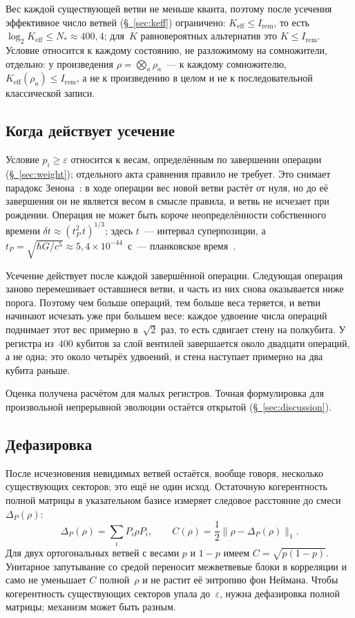 \documentclass[11pt,a4paper]{article}
\newcommand{\Ost}{I_{\mathrm{rem}}}
\newcommand{\Keff}{K_{\mathrm{eff}}}
\begin{document}
Вес каждой существующей ветви не меньше кванта, поэтому после усечения эффективное число ветвей (\hyperref[sec:keff]{\S~\ref*{sec:keff}}) ограничено: $\Keff\le\Ost$, то есть $\log_2\Keff\le N_*\approx400{,}4$; для~$K$ равновероятных альтернатив это $K\le\Ost$. Условие относится к каждому состоянию, не разложимому на сомножители, отдельно: у произведения $\rho=\bigotimes_a\rho_a$~--- к каждому сомножителю, $\Keff(\rho_a)\le\Ost$, а не к произведению в целом и не к последовательной классической записи.

\subsection{Когда действует усечение}
\label{sec:when}

Условие $p_i\ge\varepsilon$ относится к весам, определённым по завершении операции (\hyperref[sec:weight]{\S~\ref*{sec:weight}}); отдельного акта сравнения правило не требует. Это снимает парадокс Зенона~\cite{misra1977}: в ходе операции вес новой ветви растёт от нуля, но до её завершения он не является весом в смысле правила, и ветвь не исчезает при рождении. Операция не может быть короче неопределённости собственного времени $\delta t\approx(t_P^2\,t)^{1/3}$; здесь $t$~--- интервал суперпозиции, а $t_P=\sqrt{\hbar G/c^5}\approx5{,}4\times10^{-44}$~с~--- планковское время~\cite{karolyhazy1966,ponfilenok2026bdpt}.

Усечение действует после каждой завершённой операции. Следующая операция заново перемешивает оставшиеся ветви, и часть из них снова оказывается ниже порога. Поэтому чем больше операций, тем больше веса теряется, и ветви начинают исчезать уже при большем весе: каждое удвоение числа операций поднимает этот вес примерно в~$\sqrt2$ раз, то есть сдвигает стену на полкубита. У регистра из~$400$ кубитов за слой вентилей завершается около двадцати операций, а не одна; это около четырёх удвоений, и стена наступает примерно на два кубита раньше.

Оценка получена расчётом для малых регистров. Точная формулировка для произвольной непрерывной эволюции остаётся открытой (\hyperref[sec:discussion]{\S~\ref*{sec:discussion}}).

\subsection{Дефазировка}
\label{sec:dephasing}

После исчезновения невидимых ветвей остаётся, вообще говоря, несколько существующих секторов; это ещё не один исход. Остаточную когерентность полной матрицы в указательном базисе измеряет следовое расстояние до смеси~$\Delta_P(\rho)$:
\begin{equation}
\Delta_P(\rho)=\sum_i P_i\rho P_i,
\qquad
C(\rho)=\frac12\bigl\|\rho-\Delta_P(\rho)\bigr\|_1.
\end{equation}
Для двух ортогональных ветвей с весами $p$ и $1-p$ имеем $C=\sqrt{p(1-p)}$. Унитарное запутывание со средой переносит межветвевые блоки в корреляции и само не уменьшает $C$ полной~$\rho$ и не растит её энтропию фон Неймана. Чтобы когерентность существующих секторов упала до~$\varepsilon$, нужна дефазировка полной матрицы; механизм может быть разным.
\end{document}
